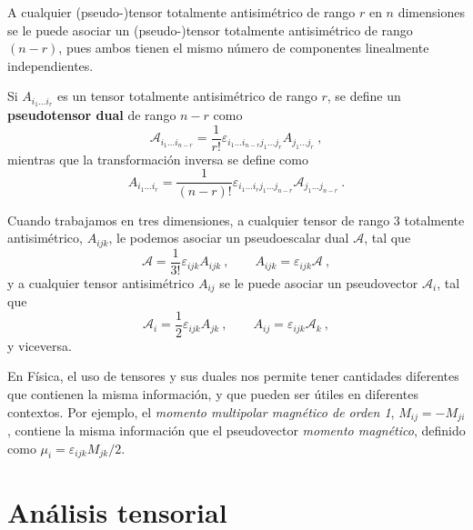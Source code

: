 A cualquier (pseudo-)tensor totalmente antisimétrico de rango $r$ en $n$ dimensiones se le puede asociar un (pseudo-)tensor totalmente antisimétrico de rango $(n-r)$, pues ambos tienen el mismo número de componentes linealmente independientes.

\begin{defi} 
    Si $A_{i_1 \dots i_r}$ es un tensor totalmente antisimétrico de rango $r$, se define un \textbf{pseudotensor dual} de rango $n-r$ como
    \begin{equation}
        \mathcal{A}_{i_1 \dots i_{n-r}} = \frac{1}{r!} \varepsilon_{i_1 \dots i_{n-r} j_1 \dots j_r} A_{j_1 \dots j_r} \ ,
    \end{equation}
    mientras que la transformación inversa se define como
    \begin{equation}
        A_{i_1 \dots i_{r}} = \frac{1}{(n-r)!} \varepsilon_{i_1 \dots i_{r} j_1 \dots j_{n-r}} \mathcal{A}_{j_1 \dots j_{n-r}} \ .
    \end{equation}
\end{defi}

Cuando trabajamos en tres dimensiones, a cualquier tensor de rango 3 totalmente antisimétrico, $A_{ijk}$, le podemos asociar un pseudoescalar dual $\mathcal{A}$, tal que
\begin{equation}
    \mathcal{A} = \frac{1}{3!} \varepsilon_{ijk} A_{ijk} \ , \qquad A_{ijk} = \varepsilon_{ijk} \mathcal{A} \ ,
\end{equation}
y a cualquier tensor antisimétrico $A_{ij}$ se le puede asociar un pseudovector $\mathcal{A}_i$, tal que
\begin{equation}
    \mathcal{A}_i = \frac{1}{2} \varepsilon_{ijk} A_{jk} \ , \qquad A_{ij} = \varepsilon_{ijk} \mathcal{A}_k \ ,
\end{equation}
y viceversa.

En Física, el uso de tensores y sus duales nos permite tener cantidades diferentes que contienen la misma información, y que pueden ser útiles en diferentes contextos. Por ejemplo, el \emph{momento multipolar magnético de orden 1}, $M_{ij} = - M_{ji}$, contiene la misma información que el pseudovector \emph{momento magnético}, definido como $\mu_i = \varepsilon_{ijk} M_{jk}/2$.

\section{Análisis tensorial}


